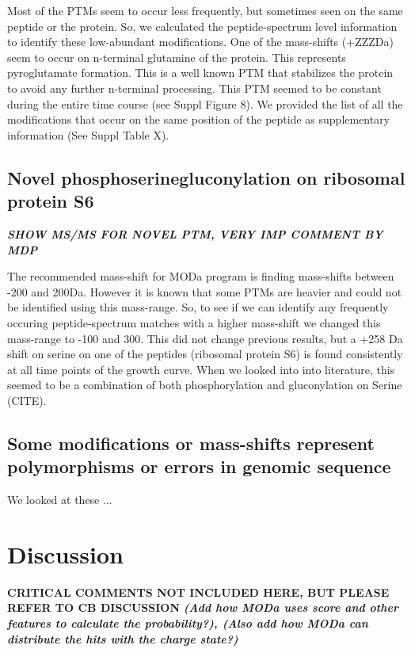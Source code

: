 \documentclass[12pt]{article}
\begin{document}
Most of the PTMs seem to occur less frequently, but sometimes seen on the same peptide or the protein. So, we calculated the peptide-spectrum level information to identify these low-abundant modifications. One of the mass-shifts (+ZZZDa) seem to occur on n-terminal glutamine of the protein. This represents pyroglutamate formation. This is a well known PTM that stabilizes the protein to avoid any further n-terminal processing. This PTM seemed to be constant during the entire time course (see Suppl Figure 8). We provided the list of all the modifications that occur on the same position of the peptide as supplementary information (See Suppl Table X).

\subsection{Novel phosphoserinegluconylation on ribosomal protein S6}


\textbf{\emph{SHOW MS/MS FOR NOVEL PTM, VERY IMP COMMENT BY MDP}}

The recommended mass-shift for MODa program is finding mass-shifts between -200 and 200Da. However it is known that some PTMs are heavier and could not be identified using this mass-range. So, to see if we can identify any frequently occuring peptide-spectrum matches with a higher mass-shift we changed this mass-range to -100 and 300. This did not change previous results, but a +258 Da shift on serine on one of the peptides (ribosomal protein S6) is found consistently at all time points of the growth curve. When we looked into into literature, this seemed to be a combination of both phosphorylation and gluconylation on Serine (CITE).

\subsection{Some modifications or mass-shifts represent polymorphisms or errors in genomic sequence}
We looked at these ...

\section{Discussion}
\textbf{CRITICAL COMMENTS NOT INCLUDED HERE, BUT PLEASE REFER TO CB DISCUSSION}
\textbf{\emph{(Add how MODa uses score and other features to calculate the probability?), (Also add how MODa can distribute the hits with the charge state?)}}
\end{document}
